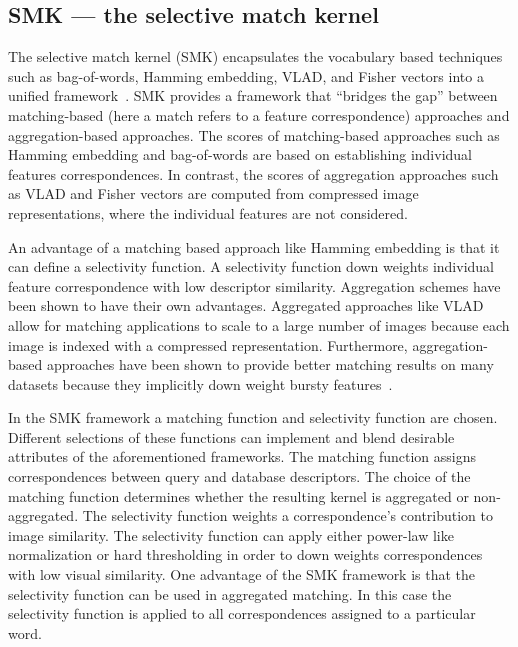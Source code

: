     \subsection{SMK --- the selective match kernel}\label{sec:smk}
        The selective match kernel (SMK) encapsulates the vocabulary based techniques such as bag-of-words, Hamming
        embedding, VLAD, and Fisher vectors into a unified framework~\cite{bo_efficient_2009,
        tolias_aggregate_2013, tolias_image_2015, jegou_triangulation_2014}. SMK provides a framework that
        ``bridges the gap'' between matching-based (here a match refers to a feature correspondence) approaches and
        aggregation-based approaches. The scores of matching-based approaches such as Hamming embedding and
        bag-of-words are based on establishing individual features correspondences. In contrast, the scores of
        aggregation approaches such as VLAD and Fisher vectors are computed from compressed image representations,
        where the individual features are not considered.

        An advantage of a matching based approach like Hamming embedding is that it can define a selectivity
        function. A selectivity function down weights individual feature correspondence with low descriptor
        similarity. Aggregation schemes have been shown to have their own advantages. Aggregated approaches like
        VLAD allow for matching applications to scale to a large number of images because each image is indexed
        with a compressed representation. Furthermore, aggregation-based approaches have been shown to provide
        better matching results on many datasets because they implicitly down weight bursty
        features~\cite{tolias_aggregate_2013, tolias_image_2015}.

        In the SMK framework a matching function and selectivity function are chosen. Different selections of these
        functions can implement and blend desirable attributes of the aforementioned frameworks. The matching
        function assigns correspondences between query and database descriptors. The choice of the matching
        function determines whether the resulting kernel is aggregated or non-aggregated. The selectivity function
        weights a correspondence's contribution to image similarity. The selectivity function can apply either
        power-law like normalization or hard thresholding in order to down weights correspondences with low visual
        similarity. One advantage of the SMK framework is that the selectivity function can be used in aggregated
        matching. In this case the selectivity function is applied to all correspondences assigned to a particular
        word.


